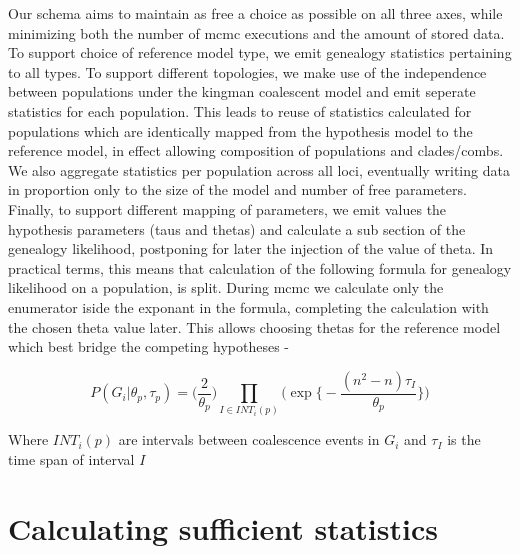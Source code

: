 \documentclass[11pt]{article}
\begin{document}
\begin{itemize}
Our schema aims to maintain as free a choice as possible on all three axes, while minimizing both the number of mcmc executions and the amount of stored data. To support choice of reference model type, we emit genealogy statistics pertaining to all types. To support different topologies, we make use of the independence between populations under the kingman coalescent model and emit seperate statistics for each population. This leads to reuse of statistics calculated for populations which are identically mapped from the hypothesis model to the reference model, in effect allowing composition of populations and clades/combs.  We also aggregate statistics per population across all loci, eventually  writing data in proportion only to the size of the model and number of free parameters. Finally, to support different mapping of parameters, we emit values the hypothesis parameters (taus and thetas) and calculate a sub section of the genealogy likelihood, postponing for later the injection of the value of theta. In practical terms, this means that calculation of the following formula for genealogy likelihood on a population, is split. During mcmc we calculate only the enumerator iside the exponant in the formula, completing the calculation with the chosen theta value later. This allows choosing thetas for the reference model which best bridge the competing hypotheses - 

\begin{equation}
P(G_i|\theta_p, \tau_p)
  = \Big( \frac{2}{\theta_p} \Big)  \prod_{I\in INT_i(p)} \bigg(  \exp \Big\{ -  \frac{(n^2-n)\tau_I}{\theta_p}   \Big\}  \bigg)
\end{equation}

Where $INT_i(p)$ are intervals between coalescence events in $G_i$ and $\tau_I$ is the time span of interval $I$



\end{itemize}


\section{Calculating sufficient statistics}
\end{document}
